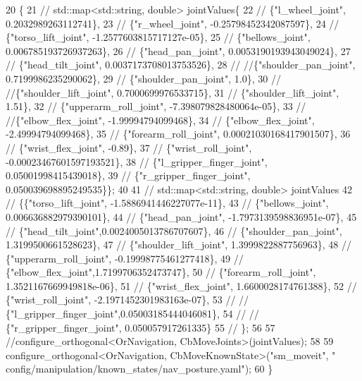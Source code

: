 \begin{DoxyCode}
20     \{
21     \textcolor{comment}{//    std::map<std::string, double> jointValues\{}
22     \textcolor{comment}{//         \{"l\_wheel\_joint", 0.2032989263112741\},}
23     \textcolor{comment}{//         \{"r\_wheel\_joint", -0.25798452342087597\},}
24     \textcolor{comment}{//         \{"torso\_lift\_joint", -1.2577603815717127e-05\},}
25     \textcolor{comment}{//         \{"bellows\_joint", 0.006785193726937263\},}
26     \textcolor{comment}{//         \{"head\_pan\_joint", 0.0053190193943049024\},}
27     \textcolor{comment}{//         \{"head\_tilt\_joint", 0.0037173708013753526\},}
28     \textcolor{comment}{//         //\{"shoulder\_pan\_joint", 0.7199986235290062\},}
29     \textcolor{comment}{//         \{"shoulder\_pan\_joint", 1.0\},}
30     \textcolor{comment}{//         //\{"shoulder\_lift\_joint", 0.7000699976533715\},}
31     \textcolor{comment}{//         \{"shoulder\_lift\_joint", 1.51\},}
32     \textcolor{comment}{//         \{"upperarm\_roll\_joint", -7.398079828480064e-05\},}
33     \textcolor{comment}{//         //\{"elbow\_flex\_joint", -1.99994794099468\},}
34     \textcolor{comment}{//         \{"elbow\_flex\_joint", -2.49994794099468\},}
35     \textcolor{comment}{//         \{"forearm\_roll\_joint", 0.00021030168417901507\},}
36     \textcolor{comment}{//         \{"wrist\_flex\_joint", -0.89\},}
37     \textcolor{comment}{//         \{"wrist\_roll\_joint", -0.00023467601597193521\},}
38     \textcolor{comment}{//         \{"l\_gripper\_finger\_joint", 0.05001998415439018\},}
39     \textcolor{comment}{//         \{"r\_gripper\_finger\_joint", 0.050039698895249535\}\};}
40 
41     \textcolor{comment}{//  std::map<std::string, double> jointValues}
42     \textcolor{comment}{//    \{\{"torso\_lift\_joint", -1.5886941446227077e-11\},}
43     \textcolor{comment}{//     \{"bellows\_joint", 0.006636882979390101\},}
44     \textcolor{comment}{//     \{"head\_pan\_joint", -1.7973139598836951e-07\},}
45     \textcolor{comment}{//     \{"head\_tilt\_joint",0.0024005013786707607\},}
46     \textcolor{comment}{//     \{"shoulder\_pan\_joint", 1.3199500661528623\},}
47     \textcolor{comment}{//     \{"shoulder\_lift\_joint", 1.3999822887756963\},}
48     \textcolor{comment}{//     \{"upperarm\_roll\_joint", -0.19998775461277418\},}
49     \textcolor{comment}{//     \{"elbow\_flex\_joint",1.7199706352473747\},}
50     \textcolor{comment}{//     \{"forearm\_roll\_joint", 1.3521167669949818e-06\},}
51     \textcolor{comment}{//     \{"wrist\_flex\_joint", 1.6600028174761388\},}
52     \textcolor{comment}{//     \{"wrist\_roll\_joint", -2.1971452301983163e-07\},}
53     \textcolor{comment}{//     // \{"l\_gripper\_finger\_joint",0.05003185444046081\},}
54     \textcolor{comment}{//     // \{"r\_gripper\_finger\_joint", 0.050057917261335\}}
55     \textcolor{comment}{//     \};}
56 
57         \textcolor{comment}{//configure\_orthogonal<OrNavigation, CbMoveJoints>(jointValues);}
58 
59         configure\_orthogonal<OrNavigation, CbMoveKnownState>(\textcolor{stringliteral}{"sm\_moveit"}, \textcolor{stringliteral}{"
      config/manipulation/known\_states/nav\_posture.yaml"});
60     \}
\end{DoxyCode}


